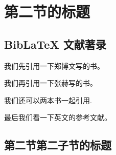 
\section{第二节的标题}

\zhlipsum[1]

\subsection{BibLaTeX 文献著录}

我们先引用一下郑博文写的书\cite{rudin1976principleschinese3}。

我们再引用一下张赫写的书\cite{rudin1976principleschinese}。

我们还可以两本书一起引用\cite{rudin1976principleschinese,rudin1976principleschinese3}.

最后我们看一下英文的参考文献\cite{rudin1976principles}。

\zhlipsum[1]

\subsection{第二节第二子节的标题}

\zhlipsum

